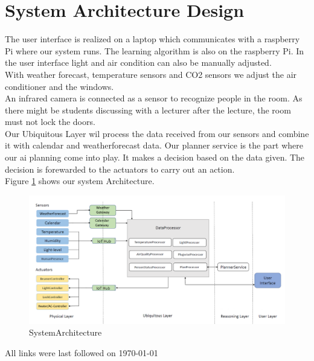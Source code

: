 \documentclass[runningheads]{llncs}
\begin{document}
\section{System Architecture Design}
The user interface is realized on a laptop which communicates with a raspberry Pi where our system runs. The learning algorithm is also on the raspberry Pi. In the user interface light and air condition can also be manually adjusted.\\
With weather forecast, temperature sensors and CO2 sensors we adjust the air conditioner and the windows. \\
An infrared camera is connected as a sensor to recognize people in the room. As there might be students discussing with a lecturer after the lecture, the room must not lock the doors. \\
Our Ubiquitous Layer wil process the data received from our sensors and combine it with calendar and weatherforecast data. Our planner service is the part where our ai planning come into play. It makes a decision based on the data given. The decision is forewarded to the actuators to carry out an action.\\

Figure \ref{fig:SystemArchitecture} shows our system Architecture.\\

\begin{figure}[H]
\centering
\includegraphics[width=1.0\textwidth]{../img/IotDiagram.png}
\caption{SystemArchitecture}
\label{fig:SystemArchitecture}
\end{figure}







%
%



All links were last followed on \today
\end{document}
